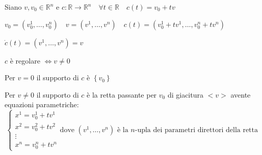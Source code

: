         \newpage
        \begin{esempio}
        Siano $v, v_0 \in \mathbb{R}^n$ e $c: \mathbb{R} \to \mathbb{R}^n \quad \forall t \in \mathbb{R} \quad c(t) = v_0 + t v$
        
        $v_0=\left(v_0^1, \ldots, v_0^n\right) \quad v=\left(v^1, \ldots, v^n\right) \quad c(t)= \left(v_0^1 +tv^1, \ldots, v_0^n +tv^n\right)$

        $\dot{c}(t)=\left(v^1, \ldots, v^n\right)=v$

        $c$ è regolare $\iff v \neq 0$

        Per $v=0$ il supporto di $c$ è $\left\{v_0\right\}$

        Per $v \neq 0$ il supporto di $c$ è la retta passante per $v_0$ di giacitura $<v>$ avente equazioni parametriche:
        \[ \begin{cases*}
        x^1 = v_0^1 + t v^1 \\
        x^2 = v_0^2 + t v^2 \\
        \vdots \\
        x^n = v_0^n + t v^n
        \end{cases*}
        \text{dove } (v^1, \ldots, v^n) \text{ è la } n\text{-upla dei parametri direttori della retta } \]
        \end{esempio}
